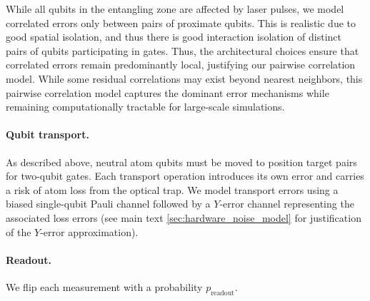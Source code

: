 \documentclass[aps, prx, reprint, superscriptaddress, longbibliography, floatfix]{revtex4-2}
\begin{document}
While all qubits in the entangling zone are affected by laser pulses, we model correlated errors only between pairs of proximate qubits. This is realistic due to good spatial isolation, and thus there is good interaction isolation of distinct pairs of qubits participating in gates. Thus, the architectural choices ensure that correlated errors remain predominantly local, justifying our pairwise correlation model. While some residual correlations may exist beyond nearest neighbors, this pairwise correlation model captures the dominant error mechanisms while remaining computationally tractable for large-scale simulations.

\paragraph{Qubit transport.} As described above, neutral atom qubits must be moved to position target pairs for two-qubit gates. Each transport operation introduces its own error and carries a risk of atom loss from the optical trap. We model transport errors using a biased single-qubit Pauli channel followed by a $Y$-error channel representing the associated loss errors (see main text \ref{sec:hardware_noise_model} for justification of the $Y$-error approximation). 

\paragraph{Readout.} We flip each measurement with a probability $p_{\text{readout}}$.
\end{document}
